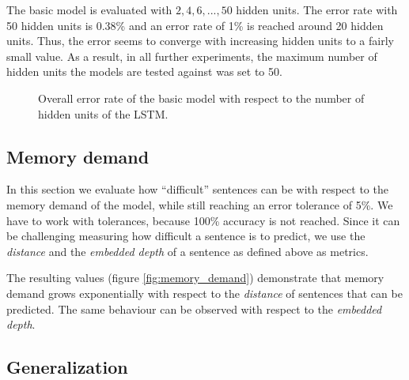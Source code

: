 \documentclass[11pt,a4paper]{article}
\newlength\figureheight
\newlength\figurewidth
\begin{document}
The basic model is evaluated with $2,4,6,...,50$ hidden units. The error rate with 50 hidden units is 0.38\% and an error rate of 1\% is reached around 20 hidden units.  Thus, the error seems to converge with increasing hidden units to a fairly small value. As a result, in all further experiments, the maximum number of hidden units the models are tested against was set to 50.

\setlength\figureheight{4cm}
\setlength\figurewidth{\linewidth}
\begin{figure}[ht]
    \caption{Overall error rate of the basic model with respect to the number of hidden units of the LSTM.}%
    \label{fig:varying_units_results}%
\end{figure}

\subsection{Memory demand}
\label{subsec:memory_demand}

In this section we evaluate how ``difficult'' sentences can be with respect to the memory demand of the model, while still reaching an error tolerance of 5\%. We have to work with tolerances, because 100\% accuracy is not reached. Since it can be challenging measuring how difficult a sentence is to predict, we use the \emph{distance} and the \emph{embedded depth} of a sentence as defined above as metrics.

\setlength\figureheight{5cm}
\setlength{}
\begin{figure*}[ht]
    \qquad
    
    \caption{\emph{Distances} (left figure) and \emph{embedded depth} (right figure) that can be predicted with a given number of hidden units and 5\% error tolerance. The dashed line is a logarithmic approximation.}%
    \label{fig:memory_demand}%
\end{figure*}

The resulting values (figure \ref{fig:memory_demand}) demonstrate that memory demand grows exponentially with respect to the \emph{distance} of sentences that can be predicted. The same behaviour can be observed with respect to the \emph{embedded depth}. 

\subsection{Generalization}
\label{subsec:generalization}
\end{document}
